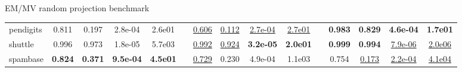 \documentclass[9pt]{beamer}
\begin{document}
\begin{frame}{EM/MV random projection benchmark}
\begin{table}[!ht]
{\begin{tabular}{l cccc c cccc c cccc}
pendigits    &0.811 &0.197 &2.8e-04&2.6e01 & &\underline{0.606} &\underline{0.112} &\underline{2.7e-04}&\underline{2.7e01}   & &\bf 0.983 &\bf 0.829 &\bf 4.6e-04&\bf 1.7e01 \\
shuttle      &0.996 &0.973 &1.8e-05&5.7e03 & &\underline{0.992} &\underline{0.924} &\bf 3.2e-05&\bf 2.0e01   & &\bf 0.999 &\bf 0.994 &\underline{7.9e-06}&\underline{2.0e06} \\
spambase     &\bf 0.824 &\bf 0.371 &\bf 9.5e-04&\bf 4.5e01&  &\underline{0.729} &0.230 &4.9e-04&1.1e03  &  &0.754 &\underline{0.173} &\underline{2.2e-04}&\underline{4.1e04} \\
\bottomrule
\end{tabular}
}
\end{table}

\end{frame}
\end{document}
